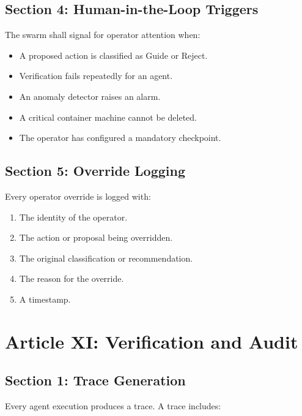 \documentclass[12pt,letterpaper]{article}
\begin{document}
\subsection{Section 4: Human-in-the-Loop Triggers}

The swarm shall signal for operator attention when:

\begin{itemize}
    \item A proposed action is classified as Guide or Reject.
    \item Verification fails repeatedly for an agent.
    \item An anomaly detector raises an alarm.
    \item A critical container machine cannot be deleted.
    \item The operator has configured a mandatory checkpoint.
\end{itemize}

\subsection{Section 5: Override Logging}

Every operator override is logged with:

\begin{enumerate}
    \item The identity of the operator.
    \item The action or proposal being overridden.
    \item The original classification or recommendation.
    \item The reason for the override.
    \item A timestamp.
\end{enumerate}

\section{Article XI: Verification and Audit}
\label{art:audit}

\subsection{Section 1: Trace Generation}

Every agent execution produces a trace. A trace includes:
\end{document}
